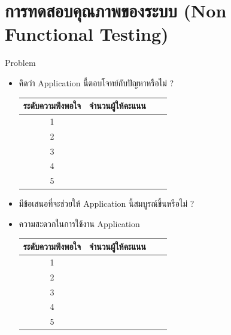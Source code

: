 \documentclass[14pt,oneside,openright,a4paper]{cpe-thai-project}
\begin{document}
  \section{การทดสอบคุณภาพของระบบ (Non Functional Testing)}
Problem
\begin{itemize}
  \item คิดว่า Application นี้ตอบโจทย์กับปัญหาหรือไม่ ?
  \begin{table}[!h]
    \centering
    \captionsetup{justification=centering} %
    \begin{tabular}{|c|c|c|c|}
      \hline
      \multicolumn{1}{|c|}{\cellcolor[HTML]{9FC5E8}ระดับความพึงพอใจ} &
        \multicolumn{1}{c|}{\cellcolor[HTML]{9FC5E8}จำนวนผู้ให้คะแนน} \\ \hline
       1 & 
         \\ \hline 
       2 & 
         \\ \hline 
       3 & 
         \\ \hline 
       4 & 
         \\ \hline 
       5 & 
         \\ \hline
    \end{tabular}
    \label{tab:Problemssolvingsatisfaction}
  \end{table}
  \item มีข้อเสนอที่จะช่วยให้ Application นี้สมบูรณ์ขึ้นหรือไม่ ?
\end{itemize}
\begin{itemize}
  \item ความสะดวกในการใช้งาน Application
  \begin{table}[!h]
    \centering
    \captionsetup{justification=centering} %
    \begin{tabular}{|c|c|c|c|}
      \hline
      \multicolumn{1}{|c|}{\cellcolor[HTML]{9FC5E8}ระดับความพึงพอใจ} &
        \multicolumn{1}{c|}{\cellcolor[HTML]{9FC5E8}จำนวนผู้ให้คะแนน} \\ \hline
       1 & 
         \\ \hline 
       2 & 
         \\ \hline 
       3 & 
         \\ \hline 
       4 & 
         \\ \hline 
       5 & 
         \\ \hline
    \end{tabular}
    \label{tab:Featuresatisfaction}
  \end{table}
\end{itemize}
\end{document}
